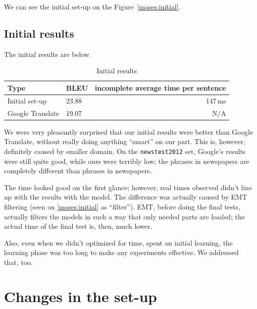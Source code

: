 We can see the initial set-up on the Figure~\ref{moses:initial}.
\subsection{Initial results}

The initial results are below.

\begin{table}[h]
\begin{center}
\begin{tabular}{|l|l|r|}
    \hline
    \textbf{Type} & \textbf{BLEU} & \textbf{incomplete average time per sentence} \\ \hline
    Initial set-up & 23.88 & 147\,ms \\ \hline
    Google Translate & 19.07 & N/A \\  \hline
\end{tabular}
\end{center}

\caption{Initial results}\label{moses:initialresults}
\end{table}

We were very pleasantly surprised that our initial results were better than Google Translate, without really doing anything ``smart'' on our part. This is, however, definitely caused by smaller domain. On the \texttt{newstest2012} set, Google's results were still quite good, while ours were terribly low; the phrases in newspapers are completely different than phrases in newspapers.

The time looked good on the first glance; however, real times observed didn't line up with the results with the model. The difference was actually caused by EMT filtering (seen on \ref{moses:initial} as ``filter''). EMT, before doing the final tests, actually filters the models in such a way that only needed parts are loaded; the actual time of the final test is, then, much lower.

Also, even when we didn't optimized for time, spent on initial learning, the learning phase was too long to make any experiments effective. We addressed that, too.

\section{Changes in the set-up}
